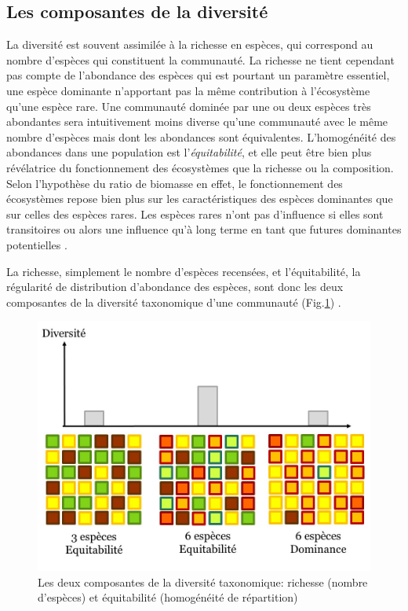 \documentclass[
  11pt,
  french,
  A4paper,
  extrafontsizes,onecolumn,openright
  ]{memoir}
\begin{document}
\subsection{Les composantes de la
diversité}\label{les-composantes-de-la-diversite}

La diversité est souvent assimilée à la richesse en espèces, qui
correspond au nombre d'espèces qui constituent la communauté. La
richesse ne tient cependant pas compte de l'abondance des espèces qui
est pourtant un paramètre essentiel, une espèce dominante n'apportant
pas la même contribution à l'écosystème qu'une espèce rare. Une
communauté dominée par une ou deux espèces très abondantes sera
intuitivement moins diverse qu'une communauté avec le même nombre
d'espèces mais dont les abondances sont équivalentes. L'homogénéité des
abondances dans une population est l'\emph{équitabilité}, et elle peut
être bien plus révélatrice du fonctionnement des écosystèmes que la
richesse ou la composition. Selon l'hypothèse du ratio de biomasse en
effet, le fonctionnement des écosystèmes repose bien plus sur les
caractéristiques des espèces dominantes que sur celles des espèces
rares. Les espèces rares n'ont pas d'influence si elles sont
transitoires ou alors une influence qu'à long terme en tant que futures
dominantes potentielles \autocite{Grime1998}.

La richesse, simplement le nombre d'espèces recensées, et
l'équitabilité, la régularité de distribution d'abondance des espèces,
sont donc les deux composantes de la diversité taxonomique d'une
communauté (Fig.\ref{fig:RichEqu})
\autocites{Whittaker1965}{Magurran2004}.

\begin{figure}

{\centering \includegraphics[width=0.6\linewidth]{ExternalFig/Fig_RichnessEquitability} 

}

\caption{Les deux composantes de la diversité taxonomique: richesse (nombre d'espèces) et équitabilité (homogénéité de répartition)}\label{fig:RichEqu}
\end{figure}
\end{document}
